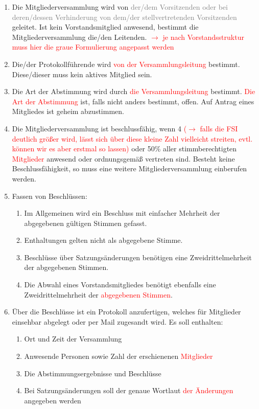 \documentclass[a4paper,12pt]{article}
\newcommand{\red}[1]{\textcolor{red}{#1}}
\newcommand{\gray}[1]{\textcolor{gray}{#1}}
\begin{document}
\begin{enumerate}
		\label{12.1}
    	\item
		Die Mitgliederversammlung wird von \gray{der/dem Vorsitzenden oder bei
		deren/dessen Verhinderung von dem/der stellvertretenden
		Vorsitzenden} geleitet. Ist kein Vorstandsmitglied anwesend,
		bestimmt die Mitgliederversammlung die/den Leitenden.
		\red{$\rightarrow$ je nach Vorstandsstruktur muss hier die graue Formulierung angepasst werden}
    	\item
		Die/der Protokollführende wird \red{von der Versammlungsleitung} bestimmt.
		Diese/dieser muss kein aktives Mitglied sein.
    	\item
		Die Art der Abstimmung wird durch \red{die Versammlungsleitung} bestimmt. \red{Die Art der Abstimmung}
		ist, falls nicht anders bestimmt, offen. Auf Antrag eines
		Mitgliedes ist geheim abzustimmen.
    	\item
		Die Mitgliederversammlung ist beschlussfähig, wenn 4 \red{($\rightarrow$ falls die FSI deutlich größer wird, lässt sich über diese kleine Zahl vielleicht streiten, evtl. können wir es aber erstmal so lassen)} oder 50\%
		aller stimmberechtigten \red{Mitglieder} anwesend oder
		ordnungsgemäß vertreten sind. Besteht keine Beschlussfähigkeit,
		so muss eine weitere Mitgliederversammlung einberufen werden.
    	\item
		Fassen von Beschlüssen:
    		\begin{enumerate}[label=(\roman*)]
			\item
				Im Allgemeinen wird ein Beschluss mit einfacher
				Mehrheit der abgegebenen gültigen Stimmen
				gefasst.
			\item
				Enthaltungen gelten nicht als abgegebene Stimme.
			\item
				Beschlüsse über Satzungsänderungen benötigen
				eine Zweidrittelmehrheit der abgegebenen
				Stimmen.
			\item
				Die Abwahl eines Vorstandsmitgliedes benötigt
				ebenfalls eine Zweidrittelmehrheit der
				\red{abgegebenen Stimmen}.
		\end{enumerate}
    	\item
		Über die Beschlüsse ist ein Protokoll anzufertigen, welches für
		Mitglieder einsehbar abgelegt oder per Mail zugesandt wird.
		Es soll enthalten:
    		\begin{enumerate}[label=(\roman*)]
        		\item
				Ort und Zeit der Versammlung
        		\item
				Anwesende Personen sowie Zahl der erschienenen
				\red{Mitglieder}
        		\item
				Die Abstimmungsergebnisse und Beschlüsse
        		\item
				Bei Satzungsänderungen soll der genaue Wortlaut
				\red{der Änderungen} angegeben werden
    		\end{enumerate}
\end{enumerate}
\end{document}
